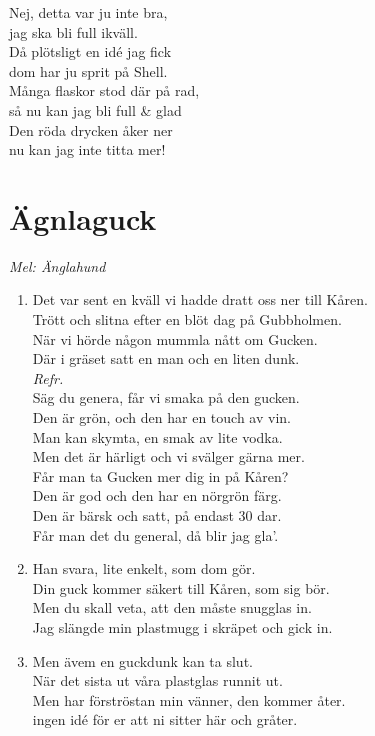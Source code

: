 \documentclass[twoside, openright]{report}
\begin{document}
Nej, detta var ju inte bra,\\
jag ska bli full ikväll.\\
Då plötsligt en idé jag fick\\
dom har ju sprit på Shell.\\
Många flaskor stod där på rad,\\
så nu kan jag bli full \& glad\\
Den röda drycken åker ner\\
nu kan jag inte titta mer!

\section{Ägnlaguck} 
\textit{Mel: Änglahund}\\

\begin{enumerate}
\item Det var sent en kväll vi hadde dratt oss ner till Kåren.\\
Trött och slitna efter en blöt dag på Gubbholmen.\\
När vi hörde någon mummla nått om Gucken.\\
Där i gräset satt en man och en liten dunk.\\

\textit{Refr.}\\
Säg du genera, får vi smaka på den gucken.\\
Den är grön, och den har en touch av vin.\\
Man kan skymta, en smak av lite vodka.\\
Men det är härligt och vi svälger gärna mer.\\
Får man ta Gucken mer dig in på Kåren?\\
Den är god och den har en nörgrön färg.\\
Den är bärsk och satt, på endast 30 dar.\\
Får man det du general, då blir jag gla'.\\

\item Han svara, lite enkelt, som dom gör.\\
Din guck kommer säkert till Kåren, som sig bör.\\
Men du skall veta, att den måste snugglas in.\\
Jag slängde min plastmugg i skräpet och gick in.\\

\item Men ävem en guckdunk kan ta slut.\\
När det sista ut våra plastglas runnit ut.\\
Men har förströstan min vänner, den kommer åter.\\
ingen idé för er att ni sitter här och gråter.

\end{enumerate}
\end{document}
